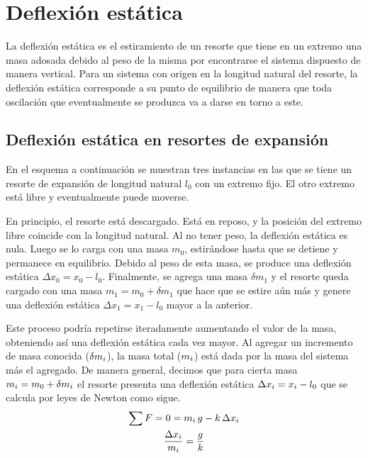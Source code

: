 \documentclass[a5paper,12pt,twoside]{book}
\begin{document}
\section{Deflexión estática}

La deflexión estática es el estiramiento de un resorte que tiene en un extremo una masa adosada debido al peso de la misma por encontrarse el sistema dispuesto de manera vertical. Para un sistema con origen en la longitud natural del resorte, la deflexión estática corresponde a su punto de equilibrio de manera que toda oscilación que eventualmente se produzca va a darse en torno a este.


\subsection*{Deflexión estática en resortes de expansión}

En el esquema a continuación se muestran tres instancias en las que se tiene un resorte de expansión de longitud natural $l_0$ con un extremo fijo. El otro extremo está libre y eventualmente puede moverse.

\begin{center}
    \def\svgwidth{0.8\linewidth}
    
\end{center}

En principio, el resorte está descargado. Está en reposo, y la posición del extremo libre coincide con la longitud natural. Al no tener peso, la deflexión estática es nula. Luego se lo carga con una masa $m_0$, estirándose hasta que se detiene y permanece en equilibrio. Debido al peso de esta masa, se produce una deflexión estática $\Delta x_0=x_0-l_0$. Finalmente, se agrega una masa $\delta m_1$ y el resorte queda cargado con una masa $m_1=m_0+\delta m_1$ que hace que se estire aún más y genere una deflexión estática $\Delta x_1=x_1-l_0$ mayor a la anterior.

Este proceso podría repetirse iteradamente aumentando el valor de la masa, obteniendo así una deflexión estática cada vez mayor. Al agregar un incremento de masa conocida ($\delta m_i$), la masa total ($m_i$) está dada por la masa del sistema más el agregado. De manera general, decimos que para cierta masa $m_i=m_0+\delta m_i$ el resorte presenta una deflexión estática $\Delta x_i=x_i-l_0$ que se calcula por leyes de Newton como sigue.
\begin{gather*}
    \sum F = 0 = m_i \, g - k \, \Delta x_i
    \\
    \frac{\Delta x_i}{m_i} = \frac{g}{k}
\end{gather*}
\end{document}
